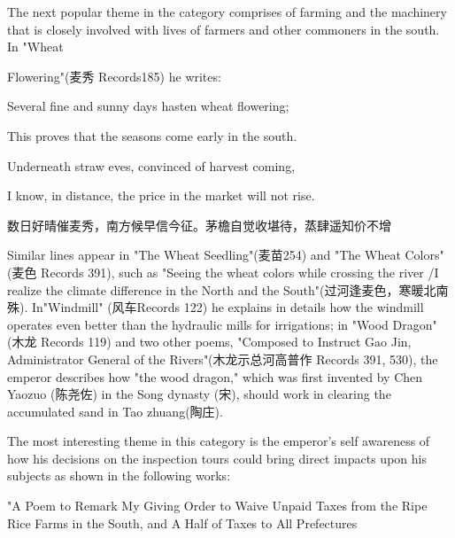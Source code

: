 The next popular theme in the category comprises of farming and the machinery that is closely involved with lives of farmers and other commoners in the south. In "Wheat


\noindent Flowering"(麦秀 Records185) he writes:

\begin{BookQuote}
Several fine and sunny days hasten wheat flowering;
\end{BookQuote}

\begin{BookQuote}
This proves that the seasons come early in the south.
\end{BookQuote}

\begin{BookQuote}
Underneath straw eves, convinced of harvest coming,
\end{BookQuote}

\begin{BookQuote}
I know, in distance, the price in the market will not rise.
\end{BookQuote}

\begin{BookQuote}
数日好晴催麦秀，南方候早信今征。茅檐自觉收堪待，蒸肆遥知价不增
\end{BookQuote}

Similar lines appear in "The Wheat Seedling"(麦苗254) and "The Wheat Colors"(麦色 Records 391), such as "Seeing the wheat colors while crossing the river /I realize the climate difference in the North and the South"(过河逢麦色，寒暖北南殊). In"Windmill" (风车Records 122) he explains in details how the windmill operates even better than the hydraulic mills for irrigations; in "Wood Dragon"(木龙 Records 119) and two other poems, "Composed to Instruct Gao Jin, Administrator General of the Rivers"(木龙示总河高普作 Records 391, 530), the emperor describes how "the wood dragon," which was first invented by Chen Yaozuo (陈尧佐) in the Song dynasty (宋), should work in clearing the accumulated sand in Tao zhuang(陶庄).

The most interesting theme in this category is the emperor's self awareness of how his decisions on the inspection tours could bring direct impacts upon his subjects as shown in the following works:

\begin{BookQuote}
"A Poem to Remark My Giving Order to Waive Unpaid Taxes from the Ripe Rice Farms in the South, and A Half of Taxes to All Prefectures
\end{BookQuote}

